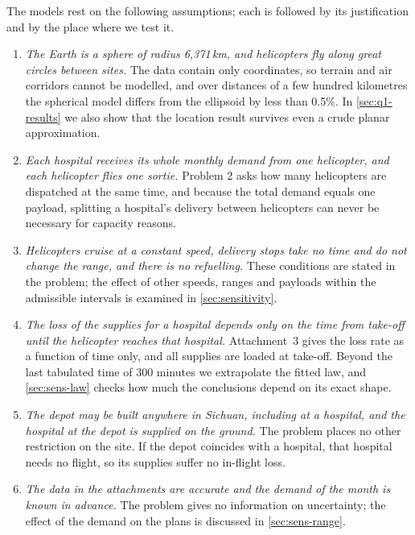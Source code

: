 \documentclass[11pt,a4paper]{article}
\theoremstyle{definition}
\begin{document}
The models rest on the following assumptions; each is followed by its justification and by the place where we test it.
\begin{enumerate}[label=A\arabic*.,leftmargin=*,itemsep=4pt]
\item \emph{The Earth is a sphere of radius 6{,}371\,km, and helicopters fly along great circles between sites.}
The data contain only coordinates, so terrain and air corridors cannot be modelled, and over distances of a few hundred kilometres the spherical model differs from the ellipsoid by less than 0.5\%.
In \cref{sec:q1-results} we also show that the location result survives even a crude planar approximation.
\item \emph{Each hospital receives its whole monthly demand from one helicopter, and each helicopter flies one sortie.}
Problem 2 asks how many helicopters are dispatched at the same time, and because the total demand equals one payload, splitting a hospital's delivery between helicopters can never be necessary for capacity reasons.
\item \emph{Helicopters cruise at a constant speed, delivery stops take no time and do not change the range, and there is no refuelling.}
These conditions are stated in the problem; the effect of other speeds, ranges and payloads within the admissible intervals is examined in \cref{sec:sensitivity}.
\item \emph{The loss of the supplies for a hospital depends only on the time from take-off until the helicopter reaches that hospital.}
Attachment~3 gives the loss rate as a function of time only, and all supplies are loaded at take-off.
Beyond the last tabulated time of 300 minutes we extrapolate the fitted law, and \cref{sec:sens-law} checks how much the conclusions depend on its exact shape.
\item \emph{The depot may be built anywhere in Sichuan, including at a hospital, and the hospital at the depot is supplied on the ground.}
The problem places no other restriction on the site.
If the depot coincides with a hospital, that hospital needs no flight, so its supplies suffer no in-flight loss.
\item \emph{The data in the attachments are accurate and the demand of the month is known in advance.}
The problem gives no information on uncertainty; the effect of the demand on the plans is discussed in \cref{sec:sens-range}.
\end{enumerate}

\end{document}
